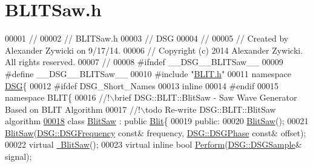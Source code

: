 \hypertarget{_b_l_i_t_saw_8h_source}{\section{B\+L\+I\+T\+Saw.\+h}
\label{_b_l_i_t_saw_8h_source}
}

\begin{DoxyCode}
00001 \textcolor{comment}{//}
00002 \textcolor{comment}{//  BLITSaw.h}
00003 \textcolor{comment}{//  DSG}
00004 \textcolor{comment}{//}
00005 \textcolor{comment}{//  Created by Alexander Zywicki on 9/17/14.}
00006 \textcolor{comment}{//  Copyright (c) 2014 Alexander Zywicki. All rights reserved.}
00007 \textcolor{comment}{//}
00008 \textcolor{preprocessor}{#ifndef \_\_DSG\_\_BLITSaw\_\_}
00009 \textcolor{preprocessor}{#define \_\_DSG\_\_BLITSaw\_\_}
00010 \textcolor{preprocessor}{#include "\hyperlink{_b_l_i_t_8h}{BLIT.h}"}
00011 \textcolor{keyword}{namespace }\hyperlink{namespace_d_s_g}{DSG}\{
00012 \textcolor{preprocessor}{#ifdef DSG\_Short\_Names}
00013     \textcolor{keyword}{inline}
00014 \textcolor{preprocessor}{#endif}
00015     \textcolor{keyword}{namespace }BLIT\{\textcolor{comment}{}
00016 \textcolor{comment}{        //!\(\backslash\)brief DSG::BLIT::BlitSaw - Saw Wave Generator Based on BLIT Algorithm}
00017 \textcolor{comment}{        //!\(\backslash\)todo Re-write DSG::BLIT::BlitSaw algorithm}
\hypertarget{_b_l_i_t_saw_8h_source_l00018}{}\hyperlink{class_d_s_g_1_1_b_l_i_t_1_1_blit_saw}{00018} \textcolor{comment}{}        \textcolor{keyword}{class }\hyperlink{class_d_s_g_1_1_b_l_i_t_1_1_blit_saw}{BlitSaw} : \textcolor{keyword}{public} \hyperlink{class_d_s_g_1_1_b_l_i_t_1_1_blit}{Blit}\{
00019         \textcolor{keyword}{public}:
00020             \hyperlink{class_d_s_g_1_1_b_l_i_t_1_1_blit_saw_a5c73a4aeb4df74da4db4896edeb15059}{BlitSaw}();
00021             \hyperlink{class_d_s_g_1_1_b_l_i_t_1_1_blit_saw_a5c73a4aeb4df74da4db4896edeb15059}{BlitSaw}(\hyperlink{namespace_d_s_g_a4315a061386fa1014fda09b15d3a6973}{DSG::DSGFrequency} \textcolor{keyword}{const}& frequency,
      \hyperlink{namespace_d_s_g_a44431ce1eb0a7300efdd207bc879e52c}{DSG::DSGPhase} \textcolor{keyword}{const}& offset);
00022             \textcolor{keyword}{virtual} \hyperlink{class_d_s_g_1_1_b_l_i_t_1_1_blit_saw_a4744c63b29aee896823f19965e11e515}{~BlitSaw}();
00023             \textcolor{keyword}{virtual} \textcolor{keyword}{inline} \textcolor{keywordtype}{bool} \hyperlink{class_d_s_g_1_1_b_l_i_t_1_1_blit_saw_ae24821c51b23b9fe9220a620e558af04}{Perform}(\hyperlink{namespace_d_s_g_ac39a94cd27ebcd9c1e7502d0c624894a}{DSG::DSGSample}& signal);

\end{DoxyCode}
